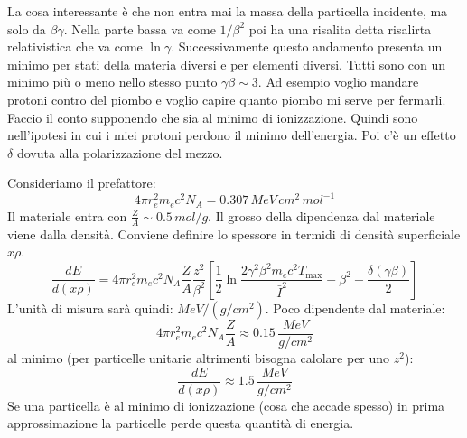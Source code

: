 La cosa interessante è che non entra mai la massa della particella incidente, ma solo da $\beta\gamma$. Nella parte bassa va come $1/\beta^2$ poi ha una risalita detta risalirta relativistica che va come $\ln{\gamma}$. Successivamente questo andamento presenta un minimo per stati della materia diversi e per elementi diversi. Tutti sono con un minimo più o meno nello stesso punto $\gamma\beta\sim 3$. Ad esempio voglio mandare protoni contro del piombo e voglio capire quanto piombo mi serve per fermarli. Faccio il conto supponendo che sia al minimo di ionizzazione. Quindi sono nell'ipotesi in cui i miei protoni perdono il minimo dell'energia. Poi c'è un effetto $\delta$ dovuta alla polarizzazione del mezzo.

Consideriamo il prefattore:
\begin{equation*}
    4\pi r_e^2m_ec^2N_A=0.307\,MeV\,cm^2\,mol^{-1}
\end{equation*}
Il materiale entra con $\frac{Z}{A}\sim 0.5\,mol/g$. Il grosso della dipendenza dal materiale viene dalla densità. Conviene definire lo spessore in termidi di densità superficiale $x\rho$.
\begin{equation*}
    \frac{dE}{d(x\rho)}=4 \pi r_e^2 m_e c^2 N_A\frac{Z}{A}\frac{z^2}{\beta^2}\left[\frac{1}{2} \ln \frac{2 \gamma^2 \beta^2 m_e c^2 T_{\max }}{\bar{I}^2}-\beta^2-\frac{\delta(\gamma \beta)}{2}\right] 
\end{equation*}
L'unità di misura sarà quindi: $MeV/(g/cm^2)$. Poco dipendente dal materiale:
\begin{equation*}
     4\pi r_e^2m_ec^2N_A\frac{Z}{A}\approx0.15\,\frac{MeV}{g/cm^{2}}
\end{equation*}
al minimo (per particelle unitarie altrimenti bisogna calolare per uno $z^2$):
\begin{equation*}
    \frac{dE}{d(x\rho)}\approx1.5\,\frac{MeV}{g/cm^2}
\end{equation*}
Se una particella è al minimo di ionizzazione (cosa che accade spesso) in prima approssimazione la particelle perde questa quantità di energia.
